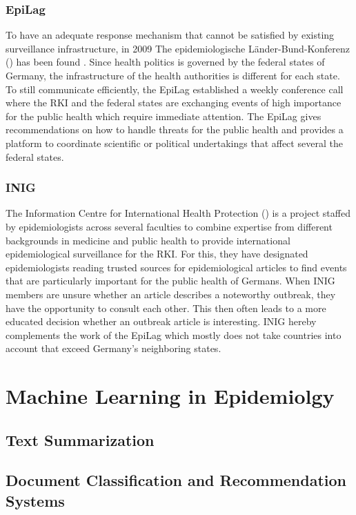 \subsubsection{EpiLag}
To have an adequate response mechanism that cannot be satisfied by existing surveillance infrastructure, in 2009 The epidemiologische L\"ander-Bund-Konferenz () has been found \cite{EpiLag}. Since health politics is governed by the federal states of Germany, the infrastructure of the health authorities is different for each state. To still communicate efficiently, the EpiLag established a weekly conference call where the RKI and the federal states are exchanging events of high importance for the public health which require immediate attention. The EpiLag gives recommendations on how to handle threats for the public health and provides a platform to coordinate scientific or political undertakings that affect several the federal states.

\subsubsection{INIG}
The Information Centre for International Health Protection () is a project staffed by epidemiologists across several faculties to combine expertise from different backgrounds in medicine and public health to provide international epidemiological surveillance for the RKI. For this, they have designated epidemiologists reading trusted sources for epidemiological articles to find events that are particularly important for the public health of Germans. When INIG members are unsure whether an article describes a noteworthy outbreak, they have the opportunity to consult each other. This then often leads to a more educated decision whether an outbreak article is interesting. INIG hereby complements the work of the EpiLag which mostly does not take countries into account that exceed Germany's neighboring states.

\section{Machine Learning in Epidemiolgy}

\subsection{Text Summarization}

\subsection{Document Classification and Recommendation Systems}



